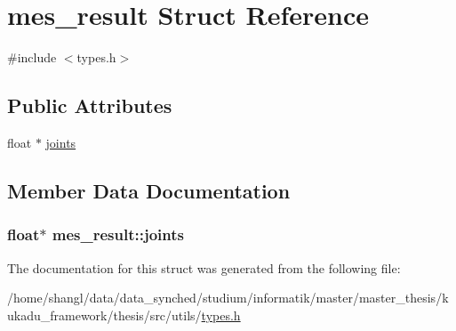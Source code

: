 \hypertarget{structmes__result}{\section{mes\-\_\-result \-Struct \-Reference}
\label{structmes__result}
}


{\ttfamily \#include $<$types.\-h$>$}

\subsection*{\-Public \-Attributes}
\begin{DoxyCompactItemize}
\item 
float $\ast$ \hyperlink{structmes__result_a332fdbaad9f2ba4bda329195c3ce8eda}{joints}
\end{DoxyCompactItemize}


\subsection{\-Member \-Data \-Documentation}
\hypertarget{structmes__result_a332fdbaad9f2ba4bda329195c3ce8eda}{
\subsubsection[{joints}]{\setlength{\rightskip}{0pt plus 5cm}float$\ast$ {\bf mes\-\_\-result\-::joints}}}\label{structmes__result_a332fdbaad9f2ba4bda329195c3ce8eda}


\-The documentation for this struct was generated from the following file\-:\begin{DoxyCompactItemize}
\item 
/home/shangl/data/data\-\_\-synched/studium/informatik/master/master\-\_\-thesis/kukadu\-\_\-framework/thesis/src/utils/\hyperlink{types_8h}{types.\-h}\end{DoxyCompactItemize}
